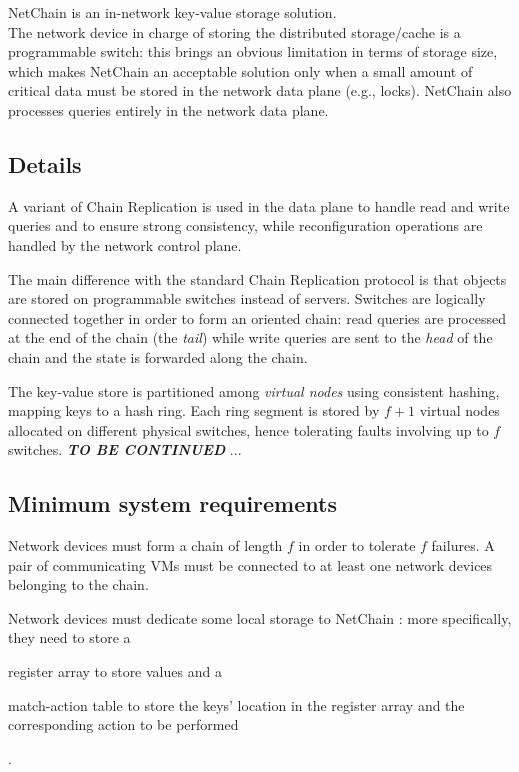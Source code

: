 NetChain \cite{netchain} is an in-network key-value storage solution.\\
The network device in charge of storing the distributed storage/cache is a programmable switch: this brings an obvious limitation in terms of storage size, which makes NetChain \cite{netchain} an acceptable solution only when a small amount of critical data must be stored in the network data plane (e.g., locks).
NetChain \cite{netchain} also processes queries entirely in the network data plane.

\subsection{Details}
A variant of Chain Replication \cite{chainreplication} is used in the data plane to handle read and write queries and to ensure strong consistency, while reconfiguration operations are handled by the network control plane.\par
The main difference with the standard Chain Replication \cite{chainreplication} protocol is that objects are stored on programmable switches instead of servers.
Switches are logically connected together in order to form an oriented chain: read queries are processed at the end of the chain (the \textit{tail}) while write queries are sent to the \textit{head} of the chain and the state is forwarded along the chain.\par
The key-value store is partitioned among \textit{virtual nodes} using consistent hashing, mapping keys to a hash ring.
Each ring segment is stored by $f + 1$ virtual nodes allocated on different physical switches, hence tolerating faults involving up to $f$ switches.
\textbf{\textit{TO BE CONTINUED}} ...

\subsection{Minimum system requirements}
Network devices must form a chain of length $f$ in order to tolerate $f$ failures. A pair of communicating VMs must be connected to at least one network devices belonging to the chain.\par
Network devices must dedicate some local storage to NetChain \cite{netchain}: more specifically, they need to store a
\begin{mylist}
    \item register array to store values and a
    \item match-action table to store the keys' location in the register array and the corresponding action to be performed
\end{mylist}.